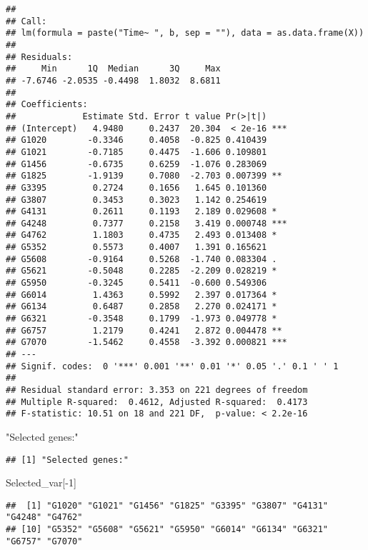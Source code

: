 \documentclass[
]{article}
\newenvironment{Shaded}{\begin{snugshade}}{\end{snugshade}}
\newcommand{\DecValTok}[1]{\textcolor[rgb]{0.00,0.00,0.81}{#1}}
\newcommand{\NormalTok}[1]{#1}
\newcommand{\SpecialCharTok}[1]{\textcolor[rgb]{0.00,0.00,0.00}{#1}}
\newcommand{\StringTok}[1]{\textcolor[rgb]{0.31,0.60,0.02}{#1}}
\begin{document}
\begin{verbatim}
## 
## Call:
## lm(formula = paste("Time~ ", b, sep = ""), data = as.data.frame(X))
## 
## Residuals:
##     Min      1Q  Median      3Q     Max 
## -7.6746 -2.0535 -0.4498  1.8032  8.6811 
## 
## Coefficients:
##             Estimate Std. Error t value Pr(>|t|)    
## (Intercept)   4.9480     0.2437  20.304  < 2e-16 ***
## G1020        -0.3346     0.4058  -0.825 0.410439    
## G1021        -0.7185     0.4475  -1.606 0.109801    
## G1456        -0.6735     0.6259  -1.076 0.283069    
## G1825        -1.9139     0.7080  -2.703 0.007399 ** 
## G3395         0.2724     0.1656   1.645 0.101360    
## G3807         0.3453     0.3023   1.142 0.254619    
## G4131         0.2611     0.1193   2.189 0.029608 *  
## G4248         0.7377     0.2158   3.419 0.000748 ***
## G4762         1.1803     0.4735   2.493 0.013408 *  
## G5352         0.5573     0.4007   1.391 0.165621    
## G5608        -0.9164     0.5268  -1.740 0.083304 .  
## G5621        -0.5048     0.2285  -2.209 0.028219 *  
## G5950        -0.3245     0.5411  -0.600 0.549306    
## G6014         1.4363     0.5992   2.397 0.017364 *  
## G6134         0.6487     0.2858   2.270 0.024171 *  
## G6321        -0.3548     0.1799  -1.973 0.049778 *  
## G6757         1.2179     0.4241   2.872 0.004478 ** 
## G7070        -1.5462     0.4558  -3.392 0.000821 ***
## ---
## Signif. codes:  0 '***' 0.001 '**' 0.01 '*' 0.05 '.' 0.1 ' ' 1
## 
## Residual standard error: 3.353 on 221 degrees of freedom
## Multiple R-squared:  0.4612, Adjusted R-squared:  0.4173 
## F-statistic: 10.51 on 18 and 221 DF,  p-value: < 2.2e-16
\end{verbatim}

\begin{Shaded}
\begin{Highlighting}[]
\StringTok{"Selected genes:"}
\end{Highlighting}
\end{Shaded}

\begin{verbatim}
## [1] "Selected genes:"
\end{verbatim}

\begin{Shaded}
\begin{Highlighting}[]
\NormalTok{Selected\_var[}\SpecialCharTok{{-}}\DecValTok{1}\NormalTok{]}
\end{Highlighting}
\end{Shaded}

\begin{verbatim}
##  [1] "G1020" "G1021" "G1456" "G1825" "G3395" "G3807" "G4131" "G4248" "G4762"
## [10] "G5352" "G5608" "G5621" "G5950" "G6014" "G6134" "G6321" "G6757" "G7070"
\end{verbatim}
\end{document}

